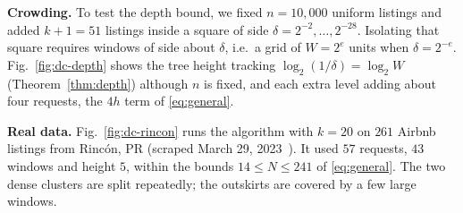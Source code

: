 \textbf{Crowding.} To test the depth bound, we fixed $n=10{,}000$ uniform
listings and added $k+1=51$ listings inside a square of side
$\delta=2^{-2},\dots,2^{-28}$. Isolating that square requires windows of side
about $\delta$, i.e.\ a grid of $W=2^e$ units when $\delta=2^{-e}$.
Fig.~\ref{fig:dc-depth} shows the tree height tracking
$\log_2(1/\delta)=\log_2 W$ (Theorem~\ref{thm:depth}) although $n$ is fixed,
and each extra level adding about four requests, the $4h$ term of
\eqref{eq:general}.

\textbf{Real data.} Fig.~\ref{fig:dc-rincon} runs the algorithm with $k=20$ on
$261$ Airbnb listings from Rinc\'on, PR (scraped March 29, 2023~\cite{danial2023airbnb}).
It used $57$ requests, $43$ windows and height $5$, within the bounds
$14\le N\le 241$ of \eqref{eq:general}. The two dense clusters are split
repeatedly; the outskirts are covered by a few large windows.
